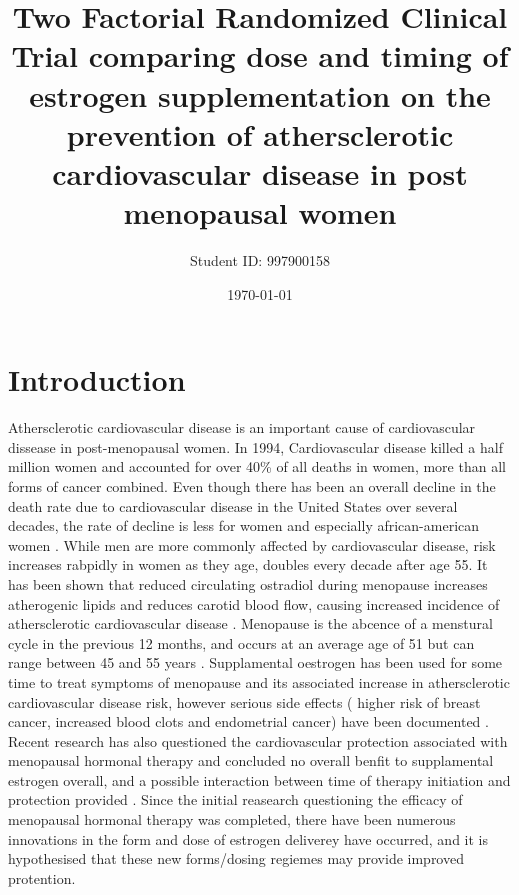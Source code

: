 \documentclass[11pt]{article}
\title{Two Factorial Randomized Clinical Trial comparing dose and timing of estrogen supplementation on the prevention of athersclerotic cardiovascular disease in post menopausal women}
\author{Student ID: 997900158}
\date{\today}
\begin{document}
	\maketitle
	\begin{abstract}

	\end{abstract}

\doublespace
	\section{Introduction} 
		Athersclerotic cardiovascular disease is an important cause of cardiovascular dissease in post-menopausal women.
		In 1994, Cardiovascular disease killed a half million women and accounted for over 40\% of all deaths in women, more than all forms of cancer combined\cite{AHA1997}.
		Even though there has been an overall decline in the death rate due to cardiovascular disease in the United States over several decades, the rate of decline is less for women and especially african-american women \cite{Mosca1997}.
		While men are more commonly affected by cardiovascular disease, risk increases rabpidly in women as they age, doubles every decade after age 55\cite{Gordon1978}. 
		It has been shown that reduced circulating ostradiol during menopause increases atherogenic lipids and reduces carotid blood flow, causing increased incidence of athersclerotic cardiovascular disease \cite{Hodis}.
		Menopause is the abcence of a menstural cycle in the previous 12 months, and occurs at an average age of 51 but can range between 45 and 55 years \cite{Gold2012}. 
		Supplamental oestrogen has been used for some time to treat symptoms of menopause and its associated increase in athersclerotic cardiovascular disease risk, however serious side effects ( higher risk of breast cancer, increased blood clots and endometrial cancer) have been documented \cite{Gold2012}.
		Recent research has also questioned the cardiovascular protection associated with menopausal hormonal therapy and concluded no overall benfit to supplamental estrogen overall, and a possible interaction between time of therapy initiation and protection provided \cite{Anderson2004,Prentice2009}.
		Since the initial reasearch questioning the efficacy of menopausal hormonal therapy was completed, there have been numerous innovations in the form and dose of estrogen deliverey have occurred, and it is hypothesised that these new forms/dosing regiemes may provide improved protention.
\end{document}
